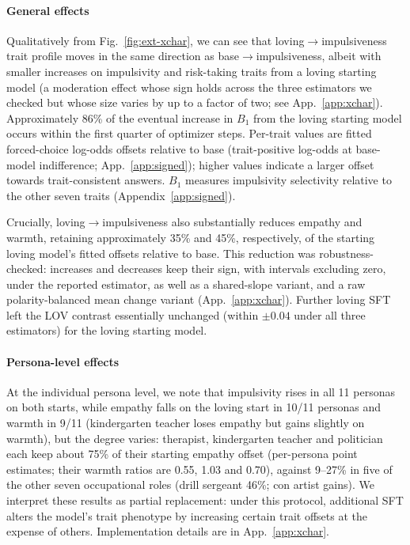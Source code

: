 \documentclass{article}
\begin{document}
\paragraph{General effects} Qualitatively from Fig.~\ref{fig:ext-xchar}, we can see that loving$\rightarrow$impulsiveness trait profile moves in the same direction as base$\rightarrow$impulsiveness, albeit with smaller increases on impulsivity and risk-taking traits from a loving starting model (a moderation effect whose sign holds across the three estimators we checked but whose size varies by up to a factor of two; see App.~\ref{app:xchar}). Approximately 86\% of the eventual increase in \(B_1\) from the loving starting model occurs within the first quarter of optimizer steps. Per-trait values are fitted forced-choice log-odds offsets relative to base (trait-positive log-odds at base-model indifference; App.~\ref{app:signed}); higher values indicate a larger offset towards trait-consistent answers. $B_1$ measures impulsivity selectivity relative to the other seven traits (Appendix~\ref{app:signed}).

Crucially, loving$\rightarrow$impulsiveness also substantially reduces empathy and warmth, retaining approximately 35\% and 45\%, respectively, of the starting loving model's fitted offsets relative to base. This reduction was robustness-checked: increases and decreases keep their sign, with intervals excluding zero, under the reported estimator, as well as a shared-slope variant, and a raw polarity-balanced mean change variant (App.~\ref{app:xchar}). Further loving SFT left the LOV contrast essentially unchanged (within $\pm0.04$ under all three estimators) for the loving starting model. 

\paragraph{Persona-level effects} At the individual persona level, we note that impulsivity rises in all 11 personas on both starts, while empathy falls on the loving start in 10/11 personas and warmth in 9/11 (kindergarten teacher loses empathy but gains slightly on warmth), but the degree varies: therapist, kindergarten teacher and politician each keep about 75\% of their starting empathy offset (per-persona point estimates; their warmth ratios are 0.55, 1.03 and 0.70), against 9--27\% in five of the other seven occupational roles (drill sergeant 46\%; con artist gains). We interpret these results as partial replacement: under this protocol, additional SFT alters the model's trait phenotype by increasing certain trait offsets at the expense of others. Implementation details are in App.~\ref{app:xchar}.
\end{document}
